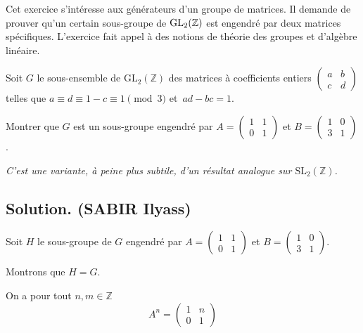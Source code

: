 Cet exercice s'int{\'e}resse aux g{\'e}n{\'e}rateurs d'un groupe de matrices.
Il demande de prouver qu'un certain sous-groupe de $\operatorname{GL}_2 (\mathbb{Z})$
est engendr{\'e} par deux matrices sp{\'e}cifiques. L'exercice fait appel
{\`a} des notions de th{\'e}orie des groupes et d'alg{\`e}bre lin{\'e}aire.

\begin{exercise}
Soit $G$ le sous-ensemble de $\mathrm{GL}_2 (\mathbb{Z})$ des matrices {\`a}
coefficients entiers $\left( \begin{array}{ll}
  a & b\\
  c & d
\end{array} \right)$ telles que $a \equiv d \equiv 1 - c \equiv 1 \pmod{3}$
et~$ad - bc = 1$.

Montrer que $G$ est un sous-groupe engendr{\'e} par $A = \left(
\begin{array}{ll}
  1 & 1\\
  0 & 1
\end{array} \right)$ et $B = \left( \begin{array}{ll}
  1 & 0\\
  3 & 1
\end{array} \right)$.

\textit{ C'est une variante, {\`a} peine plus subtile, d'un r{\'e}sultat
analogue sur $\mathrm{SL}_2 (\mathbb{Z})$.}
\end{exercise}

\subsection*{Solution. (SABIR Ilyass)}

Soit $H$ le sous-groupe de $G$ engendr{\'e} par $A = \left(\begin{array}{cc}
  1 & 1\\
  0 & 1
\end{array}\right)$ et $B = \left(\begin{array}{cc}
  1 & 0\\
  3 & 1
\end{array}\right)$.

Montrons que $H = G$.

On a pour tout $n, m \in \mathbb{Z}$
\[ A^n = \left(\begin{array}{cc}
     1 & n\\
     0 & 1
   \end{array}\right) \]


